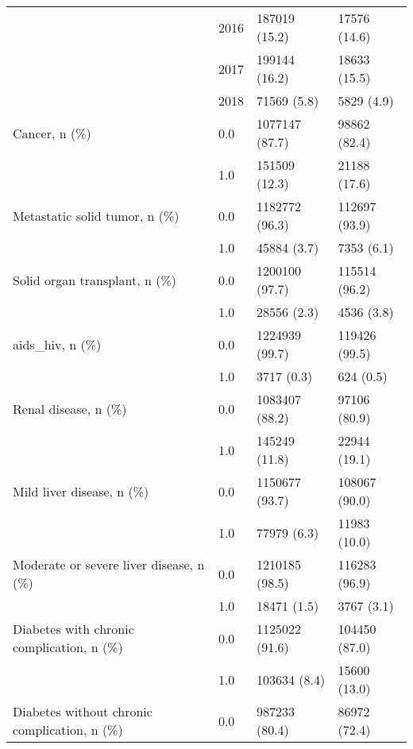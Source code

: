 \begin{tabular}{llll}
                                       & 2016 &           187019 (15.2) &      17576 (14.6) \\
                                       & 2017 &           199144 (16.2) &      18633 (15.5) \\
                                       & 2018 &             71569 (5.8) &        5829 (4.9) \\
Cancer, n (\%) & 0.0 &          1077147 (87.7) &      98862 (82.4) \\
                                       & 1.0 &           151509 (12.3) &      21188 (17.6) \\
Metastatic solid tumor, n (\%) & 0.0 &          1182772 (96.3) &     112697 (93.9) \\
                                       & 1.0 &             45884 (3.7) &        7353 (6.1) \\
Solid organ transplant, n (\%) & 0.0 &          1200100 (97.7) &     115514 (96.2) \\
                                       & 1.0 &             28556 (2.3) &        4536 (3.8) \\
aids\_hiv, n (\%) & 0.0 &          1224939 (99.7) &     119426 (99.5) \\
                                       & 1.0 &              3717 (0.3) &         624 (0.5) \\
Renal disease, n (\%) & 0.0 &          1083407 (88.2) &      97106 (80.9) \\
                                       & 1.0 &           145249 (11.8) &      22944 (19.1) \\
Mild liver disease, n (\%) & 0.0 &          1150677 (93.7) &     108067 (90.0) \\
                                       & 1.0 &             77979 (6.3) &      11983 (10.0) \\
Moderate or severe liver disease, n (\%) & 0.0 &          1210185 (98.5) &     116283 (96.9) \\
                                       & 1.0 &             18471 (1.5) &        3767 (3.1) \\
Diabetes with chronic complication, n (\%) & 0.0 &          1125022 (91.6) &     104450 (87.0) \\
                                       & 1.0 &            103634 (8.4) &      15600 (13.0) \\
Diabetes without chronic complication, n (\%) & 0.0 &           987233 (80.4) &      86972 (72.4) \\

\end{tabular}
